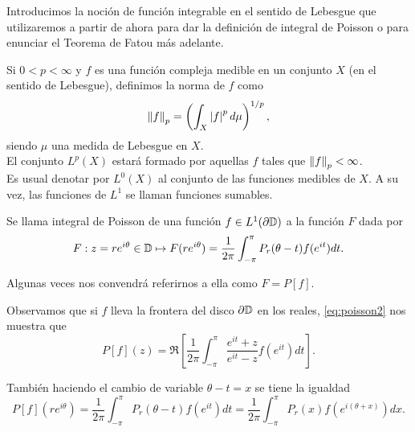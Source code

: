 Introducimos la noción de función integrable en el sentido de Lebesgue que utilizaremos a partir de ahora para dar la definición de integral de Poisson o para enunciar el Teorema de Fatou más adelante. \\

\begin{definition}
    Si $0 < p < \infty$ y $f$ es una función compleja medible en un conjunto $X$ (en el sentido de Lebesgue), definimos la norma de $f$ como
    \begin{equation*}
        \left\lVert f\right\rVert_p = \left(\int_X \left\lvert f\right\rvert^p d \mu \right)^{1/p},
    \end{equation*}
    siendo $\mu$ una medida de Lebesgue en $X$. \\ %

    El conjunto $L^p(X)$ estará formado por aquellas $f$ tales que $\left\lVert f\right\rVert_p < \infty$. \\

    Es usual denotar por $L^0(X)$ al conjunto de las funciones medibles de $X$. A su vez, las funciones de $L^1$ se llaman funciones sumables. \\
\end{definition}

\begin{definition}
    Se llama integral de Poisson de una función $f \in L^1(\partial \mathbb{D})$ a la función $F$ dada por
    \begin{equation*}
        F: z=re^{i \theta} \in \mathbb{D} \mapsto F(re^{i \theta}) = \dfrac{1}{2 \pi} \int_{- \pi}^{\pi} P_r (\theta - t) f(e^{it}) dt.
    \end{equation*}

    Algunas veces nos convendrá referirnos a ella como $F = P[f]$.
\end{definition}
\medskip

Observamos que si $f$ lleva la frontera del disco $\partial \mathbb{D}$ en los reales, \eqref{eq:poisson2} nos muestra que
\begin{equation*}
    P[f](z) = \Re \left[ \dfrac{1}{2 \pi} \int_{-\pi}^{\pi} \dfrac{e^{it} + z}{e^{it} - z} f(e^{it}) dt \right].
\end{equation*}

También haciendo el cambio de variable $\theta - t = x$ se tiene la igualdad
\begin{equation*}
    P[f](re^{i \theta}) = \dfrac{1}{2 \pi} \int_{- \pi}^{\pi} P_r (\theta - t) f(e^{it}) dt = \dfrac{1}{2 \pi} \int_{- \pi}^{\pi} P_r (x) f(e^{i(\theta + x)}) dx.
\end{equation*}

